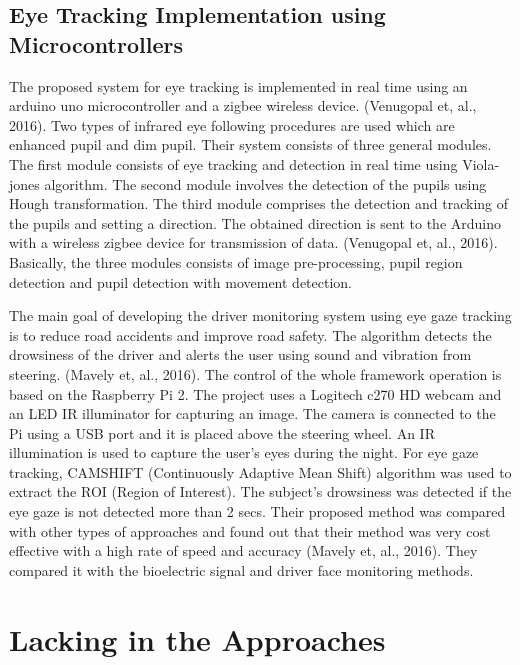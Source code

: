 \subsection{Eye Tracking Implementation using Microcontrollers}
The proposed system for eye tracking is implemented in real time using an arduino uno microcontroller and a zigbee wireless device. (Venugopal et, al., 2016). Two types of infrared eye following procedures are used which are enhanced pupil and dim pupil. Their system consists of three general modules. The first module consists of eye tracking and detection in real time using Viola-jones algorithm. The second module involves the detection of the pupils using Hough transformation. The third module  comprises the detection and tracking of the pupils and setting a direction. The obtained direction is sent to the Arduino with a wireless zigbee device for transmission of data. (Venugopal et, al., 2016). Basically, the three modules consists of image pre-processing, pupil region detection and pupil detection with movement detection. 
\newline

The main goal of developing the driver monitoring system using eye gaze tracking is to reduce road accidents and improve road safety. The algorithm detects the drowsiness of the driver and alerts the user using sound and vibration from steering. (Mavely et, al., 2016). The control of the whole framework operation is based on the Raspberry Pi 2. The project uses a Logitech c270 HD webcam and an LED IR illuminator for capturing an image. The camera is connected to the Pi using a USB port and it is placed above the steering wheel. An IR illumination is used to capture the user’s eyes during the night. For eye gaze tracking, CAMSHIFT (Continuously Adaptive Mean Shift) algorithm was used to extract the ROI (Region of Interest). The subject’s drowsiness was detected if the eye gaze is not detected more than 2 secs. Their proposed method was compared with other types of approaches and found out that their method was very cost effective with a high rate of speed and accuracy (Mavely et, al., 2016). They compared it with the bioelectric signal and driver face monitoring methods.


\section{Lacking in the Approaches}
